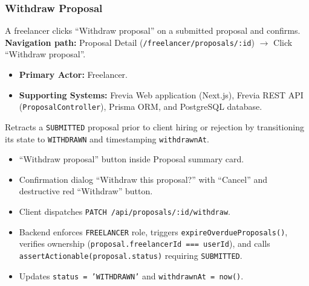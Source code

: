\subsubsection{Withdraw Proposal}

A freelancer clicks ``Withdraw proposal'' on a submitted proposal and confirms.\newline
\textbf{Navigation path:} Proposal Detail (\texttt{/freelancer/proposals/:id}) $\rightarrow$ Click ``Withdraw proposal''.


\begin{itemize}[leftmargin=1.6em,topsep=3pt,itemsep=2pt,parsep=0pt,label=$\bullet$]
    \item \textbf{Primary Actor:} Freelancer.
    \item \textbf{Supporting Systems:} Frevia Web application (Next.js), Frevia REST API (\texttt{ProposalController}), Prisma ORM, and PostgreSQL database.
\end{itemize}

\noindent Retracts a \texttt{SUBMITTED} proposal prior to client hiring or rejection by transitioning its state to \texttt{WITHDRAWN} and timestamping \texttt{withdrawnAt}.

\begin{itemize}[leftmargin=1.6em,topsep=3pt,itemsep=2pt,parsep=0pt,label=$\bullet$]
    \item ``Withdraw proposal'' button inside Proposal summary card.
    \item Confirmation dialog ``Withdraw this proposal?'' with ``Cancel'' and destructive red ``Withdraw'' button.
\end{itemize}

\begin{itemize}[leftmargin=1.6em,topsep=3pt,itemsep=2pt,parsep=0pt,label=$\bullet$]
    \item Client dispatches \texttt{PATCH /\allowbreak{}api/\allowbreak{}proposals/\allowbreak{}:\allowbreak{}id/\allowbreak{}withdraw}.
    \item Backend enforces \texttt{FREELANCER} role, triggers \texttt{expire\allowbreak{}Overdue\allowbreak{}Proposals()}, verifies ownership (\texttt{proposal.\allowbreak{}freelancerId =\allowbreak{}=\allowbreak{}= userId}), and calls \texttt{assert\allowbreak{}Actionable(\allowbreak{}proposal.\allowbreak{}status)} requiring \texttt{SUBMITTED}.
    \item Updates \texttt{status = 'WITHDRAWN'} and \texttt{withdrawnAt = now()}.
\end{itemize}

